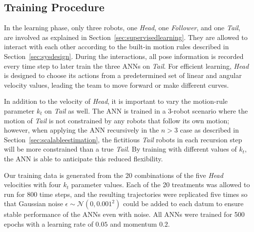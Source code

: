 \documentclass[letterpaper, 10 pt, conference]{ieeeconf}  %
\begin{document}
	\subsection{Training Procedure}
	\label{sec:learningphase}
	
	In the learning phase, only three robots, one \emph{Head}, one
	\emph{Follower}, and one \emph{Tail}, are involved as explained in
	Section~\ref{sec:supervisedlearning}. They are allowed to interact with
	each other according to the built-in motion rules described in
	Section~\ref{sec:sysdesign}. During the interactions, all pose
	information is recorded every time step to later train the three ANNs on
	\emph{Tail}. For efficient learning, \emph{Head} is designed to choose
	its actions from a predetermined set of linear and angular velocity
	values, leading the team to move forward or make different curves.
	
	In addition to the velocity of \emph{Head}, it is important to vary the motion-rule parameter
	$k_{t}$ on \emph{Tail} as well. The ANN is trained in a 3-robot scenario
	where the motion of \emph{Tail} is not constrained by any robots that
	follow its own motion; however, when applying the ANN recursively in the
	$n>3$ case as described in Section~\ref{sec:scalableestimation}, the
	fictitious \emph{Tail} robots in each recursion step will be more
	constrained than a true \emph{Tail}. By training with different values
	of $k_{t}$, the ANN is able to anticipate this reduced flexibility.
	
	Our training data is generated from the 20 combinations of the five
	\emph{Head} velocities with four $k_{t}$ parameter values. Each of the
	20 treatments was allowed to run for 800 time steps, and the resulting
	trajectories were replicated five times so that Gaussian noise $\epsilon
	\sim \mathcal{N}(0,0.001^{2})$ could be added to each datum to ensure
	stable performance of the ANNs even with noise. All ANNs were
	trained for 500 epochs with a learning rate of $0.05$ and momentum
	$0.2$.
	
	
\end{document}
